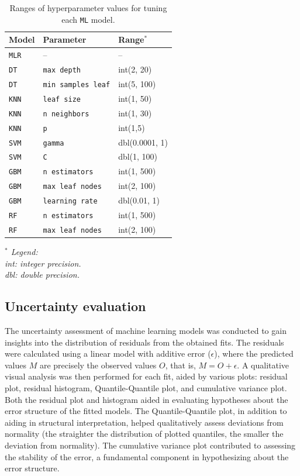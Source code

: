\documentclass[12pt]{article}
\begin{document}
\begin{table}[t]
\centering
\tiny
{}
\begin{tabular}{p{3cm}p{3cm}p{3cm}}
\toprule
\textbf{Model} & \textbf{Parameter} & \textbf{Range$^*$}\\
\midrule
\texttt{MLR} & -- & --\\
\texttt{DT} & \texttt{max depth} & int(2, 20)\\
\texttt{DT} & \texttt{min samples leaf} & int(5, 100) \\
\texttt{KNN} & \texttt{leaf size} & int(1, 50) \\
\texttt{KNN} & \texttt{n neighbors} & int(1, 30) \\
\texttt{KNN} & \texttt{p} & int(1,5) \\
\texttt{SVM} & \texttt{gamma} & dbl(0.0001, 1)\\
\texttt{SVM} & \texttt{C} & dbl(1, 100)\\
\texttt{GBM} & \texttt{n estimators} & int(1, 500)\\
\texttt{GBM} & \texttt{max leaf nodes} & int(2, 100)\\
\texttt{GBM} & \texttt{learning rate} & dbl(0.01, 1)\\
\texttt{RF} & \texttt{n estimators} & int(1, 500)\\
\texttt{RF} & \texttt{max leaf nodes} & int(2, 100)\\
\bottomrule
\end{tabular}
\smallskip
    \parbox[t]{10cm}{\footnotesize
      \textit{$^*$ Legend: \\
      int: integer precision. \\ 
      dbl: double precision.}
    }
\caption{Ranges of hyperparameter values for tuning each \texttt{ML} model.}
\label{tab:parameters}
\end{table}

\subsection{Uncertainty evaluation} \label{sec:methods:uncert}

\par The uncertainty assessment of machine learning models was conducted to gain insights into the distribution of residuals from the obtained fits. The residuals were calculated using a linear model with additive error ($\epsilon$), where the predicted values $M$ are precisely the observed values $O$, that is, $M = O + \epsilon$. A qualitative visual analysis was then performed for each fit, aided by various plots: residual plot, residual histogram, Quantile-Quantile plot, and cumulative variance plot. Both the residual plot and histogram aided in evaluating hypotheses about the error structure of the fitted models. The Quantile-Quantile plot, in addition to aiding in structural interpretation, helped qualitatively assess deviations from normality (the straighter the distribution of plotted quantiles, the smaller the deviation from normality). The cumulative variance plot contributed to assessing the stability of the error, a fundamental component in hypothesizing about the error structure.
\end{document}
